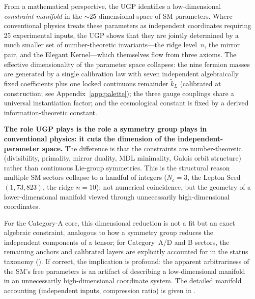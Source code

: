 \documentclass[11pt]{article}
\theoremstyle{remark}
\begin{document}
\begin{tcolorbox}[colback=violet!4,colframe=violet!50!black,
  title={\textbf{Why it works: the constraint-manifold view}},
  fonttitle=\bfseries,left=6pt,right=6pt,top=5pt,bottom=5pt,
  label={box:constraint_manifold}]

From a mathematical perspective, the UGP identifies a low-dimensional \emph{constraint manifold} in the $\sim$25-dimensional space of SM parameters.
Where conventional physics treats these parameters as independent coordinates requiring 25 experimental inputs, the UGP shows that they are jointly determined by a much smaller set of number-theoretic invariants---the ridge level~$n$, the mirror pair, and the Elegant Kernel---which themselves flow from three axioms.
The effective dimensionality of the parameter space collapses: the nine fermion masses are generated by a single calibration law with seven independent algebraically fixed coefficients plus one locked continuous remainder $\tilde{k}_L$ (calibrated at construction; see Appendix~\ref{app:palette}); the three gauge couplings share a universal instantiation factor; and the cosmological constant is fixed by a derived information-theoretic constant.

\textbf{The role UGP plays is the role a symmetry group plays in conventional physics: it cuts the dimension of the independent-parameter space.} The difference is that the constraints are number-theoretic (divisibility, primality, mirror duality, MDL minimality, Galois orbit structure) rather than continuous Lie-group symmetries.  This is the structural reason multiple SM sectors collapse to a handful of integers ($N_c{=}3$, the Lepton Seed $(1,73,823)$, the ridge $n{=}10$): not numerical coincidence, but the geometry of a lower-dimensional manifold viewed through unnecessarily high-dimensional coordinates.

For the Category-A core, this dimensional reduction is not a fit but an exact algebraic constraint, analogous to how a symmetry group reduces the independent components of a tensor; for Category~A/D and B sectors, the remaining anchors and calibrated layers are explicitly accounted for in the status taxonomy ().
If correct, the implication is profound: the apparent arbitrariness of the SM's free parameters is an artifact of describing a low-dimensional manifold in an unnecessarily high-dimensional coordinate system.  The detailed manifold accounting (independent inputs, compression ratio) is given in .

\end{tcolorbox}
\end{document}
